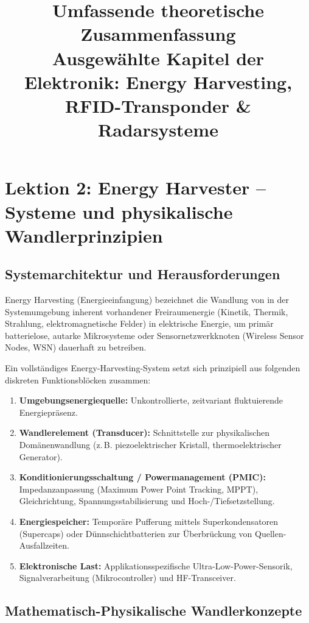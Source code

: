\documentclass[8pt,a4paper]{article}
\title{\textbf{Umfassende theoretische Zusammenfassung}\\ \large Ausgewählte Kapitel der Elektronik: Energy Harvesting, RFID-Transponder \& Radarsysteme}
\author{}
\date{}
\begin{document}
\maketitle
\tableofcontents
\newpage

\section{Lektion 2: Energy Harvester -- Systeme und physikalische Wandlerprinzipien}

\subsection{Systemarchitektur und Herausforderungen}
Energy Harvesting (Energieeinfangung) bezeichnet die Wandlung von in der Systemumgebung inherent vorhandener Freiraumenergie (Kinetik, Thermik, Strahlung, elektromagnetische Felder) in elektrische Energie, um primär batterielose, autarke Mikrosysteme oder Sensornetzwerkknoten (Wireless Sensor Nodes, WSN) dauerhaft zu betreiben. 

Ein vollständiges Energy-Harvesting-System setzt sich prinzipiell aus folgenden diskreten Funktionsblöcken zusammen:
\begin{enumerate}
    \item \textbf{Umgebungsenergiequelle:} Unkontrollierte, zeitvariant fluktuierende Energiepräsenz.
    \item \textbf{Wandlerelement (Transducer):} Schnittstelle zur physikalischen Domänenwandlung (z.\,B. piezoelektrischer Kristall, thermoelektrischer Generator).
    \item \textbf{Konditionierungsschaltung / Powermanagement (PMIC):} Impedanzanpassung (Maximum Power Point Tracking, MPPT), Gleichrichtung, Spannungsstabilisierung und Hoch-/Tiefsetzstellung.
    \item \textbf{Energiespeicher:} Temporäre Pufferung mittels Superkondensatoren (Supercaps) oder Dünnschichtbatterien zur Überbrückung von Quellen-Ausfallzeiten.
    \item \textbf{Elektronische Last:} Applikationsspezifische Ultra-Low-Power-Sensorik, Signalverarbeitung (Mikrocontroller) und HF-Transceiver.
\end{enumerate}

\subsection{Mathematisch-Physikalische Wandlerkonzepte}
\end{document}
